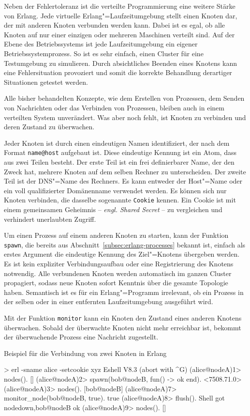 Neben der Fehlertoleranz ist die verteilte Programmierung eine weitere Stärke von Erlang. Jede virtuelle Erlang"=Laufzeitumgebung stellt einen Knoten dar, der mit anderen Knoten verbunden werden kann. Dabei ist es egal, ob alle Knoten auf nur einer einzigen oder mehreren Maschinen verteilt sind. Auf der Ebene des Betriebssystems ist jede Laufzeitumgebung ein eigener Betriebssystemprozess. So ist es sehr einfach, einen Cluster für eine Testumgebung zu simulieren. Durch absichtliches Beenden eines Knotens kann eine Fehlersituation provoziert und somit die korrekte Behandlung derartiger Situationen getestet werden.

Alle bisher behandelten Konzepte, wie dem Erstellen von Prozessen, dem Senden von Nachrichten oder das Verbinden von Prozessen, bleiben auch in einem verteilten System unverändert. Was aber noch fehlt, ist Knoten zu verbinden und deren Zustand zu überwachen.

Jeder Knoten ist durch einen eindeutigen Namen identifiziert, der nach dem Format \lstinline{name@host} aufgebaut ist. Diese eindeutige Kennung ist ein Atom, dass aus zwei Teilen besteht. Der erste Teil ist ein frei definierbarer Name, der den Zweck hat, mehrere Knoten auf dem selben Rechner zu unterscheiden. Der zweite Teil ist der DNS"=Name des Rechners. Es kann entweder der Host"=Name oder ein voll qualifizierter Domänenname verwendet werden. Es können sich nur Knoten verbinden, die dasselbe sogenannte \lstinline{Cookie} kennen. Ein Cookie ist mit einem gemeinsamen Geheimnis -- \textit{engl. Shared Secret} -- zu vergleichen und verhindert unerlaubten Zugriff.

Um einen Prozess auf einem anderen Knoten zu starten, kann der Funktion \lstinline{spawn}, die bereits aus Abschnitt~\ref{subsec:erlang-processes} bekannt ist, einfach als erstes Argument die eindeutige Kennung des Ziel"=Knotens übergeben werden. Es ist kein expliziter Verbindungsaufbau oder eine Registrierung des Knotens notwendig. Alle verbundenen Knoten werden automatisch im ganzen Cluster propagiert, sodass neue Knoten sofort Kenntnis über die gesamte Topologie haben. Semantisch ist es für ein Erlang"=Programm irrelevant, ob ein Prozess in der selben oder in einer entfernten Laufzeitumgebung ausgeführt wird.

Mit der Funktion \lstinline{monitor} kann ein Knoten den Zustand eines anderen Knotens überwachen. Sobald der überwachte Knoten nicht mehr erreichbar ist, bekommt der überwachende Prozess eine Nachricht zugestellt.

\begin{program}[!hbt]
\caption{Beispiel für die Verbindung von zwei Knoten in Erlang}
\label{prog:erlang-distributed}
\begin{ErlangCode}
> erl -sname alice -setcookie xyz
Eshell V8.3  (abort with ^G)
(alice@nodeA)1> nodes().
[]
(alice@nodeA)2> spawn(bob@nodeB, fun() -> ok end).
<7508.71.0>
(alice@nodeA)3> nodes().
[bob@nodeB]
(alice@nodeA)7> monitor_node(bob@nodeB, true).
true
(alice@nodeA)8> flush(). %
Shell got {nodedown,bob@nodeB}
ok
(alice@nodeA)9> nodes().
[]
\end{ErlangCode}
\end{program}

